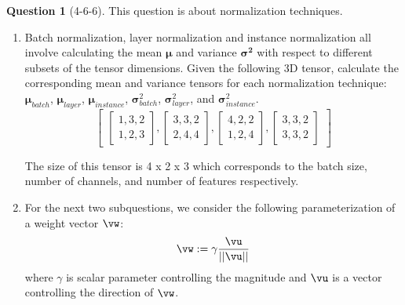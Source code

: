 \documentclass[12pt]{article}
\theoremstyle{definition}
\newtheorem{exercise}{Question}%
\newcommand{\Exercise}[1]{
#1
}
\begin{document}
\begin{exercise}[4-6-6]
\Exercise{
\label{ex:weightnorm}
This question is about normalization techniques.
\begin{enumerate}[label=\arabic{exercise}.\arabic*]
\item Batch normalization, layer normalization and instance normalization all involve calculating the mean $\boldsymbol{\mu}$ and variance $\boldsymbol{\sigma^2}$ with respect to different subsets of the tensor dimensions. Given the following 3D tensor, calculate the corresponding mean and variance tensors for each normalization technique: $\boldsymbol{\mu}_{batch}$, $\boldsymbol{\mu}_{layer}$, $\boldsymbol{\mu}_{instance}$, $\boldsymbol{\sigma}^2_{batch}$, $\boldsymbol{\sigma}^2_{layer}$, and $\boldsymbol{\sigma}^2_{instance}$. 
\\
$$\begin{bmatrix}\begin{bmatrix}1, 3, 2 \\ 1, 2, 3\end{bmatrix}, \begin{bmatrix}3, 3, 2 \\ 2, 4, 4\end{bmatrix}, \begin{bmatrix}4, 2, 2 \\ 1, 2, 4\end{bmatrix}, \begin{bmatrix}3, 3, 2 \\ 3, 3, 2\end{bmatrix} \end{bmatrix}$$

The size of this tensor is 4 x 2 x 3 which corresponds to the batch size, number of channels, and  number of features respectively. 

\item For the next two subquestions, we consider the following parameterization of a weight vector $\vw$:
$$\vw := \gamma\frac{\vu}{||\vu||}$$
where $\gamma$ is scalar parameter controlling the magnitude and $\vu$ is a vector controlling the direction of $\vw$.
\\


\end{enumerate}}
\end{exercise}
\end{document}

